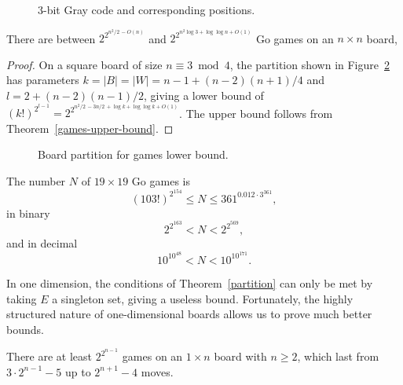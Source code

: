 \documentclass{article}
\begin{document}
\begin{figure}
\begin{center}
\epsfxsize=6cm 
\end{center}
\caption{3-bit Gray code and corresponding positions.}
\label{gray3}
\end{figure}

\begin{coro}
There are between $2^{2^{n^2/2\,-O(n)}}$
and $2^{2^{n^2 \log 3+\log\log n + O(1)}}$
Go games on an $n\times n$ board,
\end{coro}

\begin{proof}
On a square board of size $n\equiv 3 \bmod 4$, the partition shown
in Figure~\ref{bwe} has parameters
$k=|B|=|W|=n-1+(n-2)(n+1)/4$ and $l=2+(n-2)(n-1)/2$, giving a lower bound
of $(k!)^{2^{l-1}} = 2^{2^{n^2/2\, -3n/2\,+\log k + \log \log k +O(1)}}$.
The upper bound follows from Theorem~\ref{games-upper-bound}.
\end{proof}

\begin{figure}
\begin{center}
\epsfxsize=5cm 
\end{center}
\caption{Board partition for games lower bound.}
\label{bwe}
\end{figure}

\begin{coro}
The number $N$ of $19 \times 19$ Go games is
\[ (103!)^{2^{154}} \leq N \leq 361^{0.012\cdot 3^{361}}, \]
in binary
\[ 2^{2^{163}} < N <2^{2^{569}}, \]
and in decimal
\[ 10^{10^{48}} < N <10^{10^{171}}. \]
\end{coro}

In one dimension, the conditions of Theorem~\ref{partition} can only
be met by taking $E$ a singleton set, giving a useless bound.
Fortunately, the highly structured nature of one-dimensional boards allows
us to prove much better bounds.

\begin{theorem}
There are at least $2^{2^{n-1}}$ games on an $1 \times n$ board with $n\geq 2$,
which last from $3\cdot 2^{n-1}-5$ up to $2^{n+1}-4$ moves.
\end{theorem}
\end{document}
